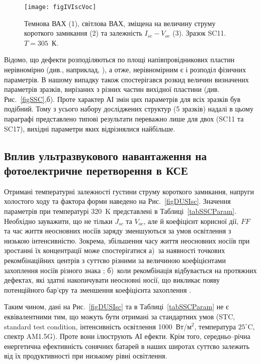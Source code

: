 \begin{figure}
\center
\texttt{[image: figIVIscVoc]}%
\caption{\label{figIVIscVoc}
Темнова ВАХ (1),
світлова ВАХ, зміщена на величину струму короткого замикання (2)
та залежність $I_{sc}-V_{oc}$ (3).
Зразок SC11.
$T=305$~К.
}%
\end{figure}

Відомо, що дефекти розподіляються по площі напівпровідникових пластин нерівномірно (див., наприклад, \cite{Oxide:Chen,Oxide_Schon}),
а отже, нерівномірним є і розподіл фізичних параметрів.
В нашому випадку також спостерігався розкид величин визначених параметрів зразків, вирізаних з різних частин вихідної пластини (див. Рис.~\ref{figSSC},б).
Проте характер АІ змін цих параметрів для всіх зразків був подібний.
Тому з усього набору досліджених структур (5 зразків) надалі в цьому параграфі представлено типові результати переважно лише для двох (SC11 та SC17),
вихідні параметри яких відрізнялися найбільше.



\subsection{Вплив ультразвукового навантаження на фотоелектричне перетворення в КСЕ}

Отримані температурні залежності густини струму короткого замикання, напруги холостого ходу та фактора форми наведено на Рис.~\ref{figDUSIsc}.
Значення параметрів при температурі 320~K представлені в Таблиці~\ref{tabSSCParam}.
Необхідно зауважити, що не тільки $J_{sc}$ та $V_{oc}$, але й коефіцієнт корисної дії, $F\!F$ та час життя неосновних носіїв
заряду зменшуються за умов освітлення з низькою інтенсивністю\cite{LI:Ruhle,LI:Reich,LI:lifetime}.
Зокрема, збільшення часу життя неосновних носіїв при зростанні їх концентрації може спостерігатися
а)~за наявності точкових рекомбінаційних центрів з суттєво різними за величиною коефіцієнтами
захоплення носіїв різного знака \cite{Breitenstein2013,TauOnIph};
б)~коли рекомбінація відбувається на протяжних дефектах, які здатні накопичувати
неосновні носії, що викликає появу потенційного бар'єру та зменшення коефіцієнта захоплення \cite{Robinson1995,Schroter1995}.

Таким чином, дані на Рис.~\ref{figDUSIsc} та в Таблиці~\ref{tabSSCParam} не є еквівалентними тим, що
можуть бути отримані за стандартних умов (STC, standard test condition, інтенсивність освітлення 1000~Вт/м$^2$,
температура $25^{\circ}$C, спектр AM1.5G).
Проте вони ілюструють АІ ефекти.
Крім того, середньо--річна енергетична ефективність сонячних батарей в наших широтах суттєво залежить від
їх продуктивності при низькому рівні освітлення.


